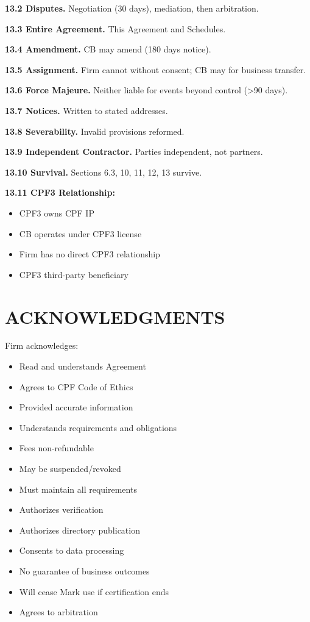 \documentclass[11pt,a4paper]{article}
\begin{document}
\textbf{13.2 Disputes.} Negotiation (30 days), mediation, then arbitration.

\textbf{13.3 Entire Agreement.} This Agreement and Schedules.

\textbf{13.4 Amendment.} CB may amend (180 days notice).

\textbf{13.5 Assignment.} Firm cannot without consent; CB may for business transfer.

\textbf{13.6 Force Majeure.} Neither liable for events beyond control (>90 days).

\textbf{13.7 Notices.} Written to stated addresses.

\textbf{13.8 Severability.} Invalid provisions reformed.

\textbf{13.9 Independent Contractor.} Parties independent, not partners.

\textbf{13.10 Survival.} Sections 6.3, 10, 11, 12, 13 survive.

\textbf{13.11 CPF3 Relationship:}
\begin{itemize}
\item CPF3 owns CPF IP
\item CB operates under CPF3 license
\item Firm has no direct CPF3 relationship
\item CPF3 third-party beneficiary
\end{itemize}

\section{ACKNOWLEDGMENTS}

Firm acknowledges:
\begin{itemize}
\item Read and understands Agreement
\item Agrees to CPF Code of Ethics
\item Provided accurate information
\item Understands requirements and obligations
\item Fees non-refundable
\item May be suspended/revoked
\item Must maintain all requirements
\item Authorizes verification
\item Authorizes directory publication
\item Consents to data processing
\item No guarantee of business outcomes
\item Will cease Mark use if certification ends
\item Agrees to arbitration
\end{itemize}
\end{document}
